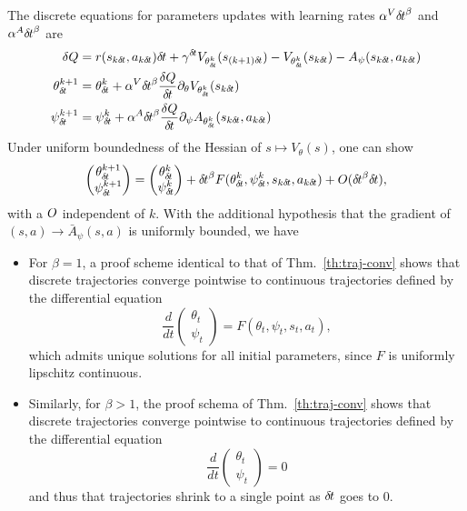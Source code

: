 The discrete equations for parameters updates with learning rates $\alpha^V {\delta\hspace{-.1em}t}^\beta$ and
$\alpha^A {\delta\hspace{-.1em}t}^\beta$ are
\begin{align}
	\delta Q &= r(s_{k \deltat}, a_{k \deltat}) \deltat + 
		\gamma^\deltat V_{\theta^{k}_\deltat}(s_{(k + 1)\deltat}) - 
		V_{\theta^k_\deltat}(s_{k\deltat}) - A_\psi(s_{k \deltat}, a_{k \deltat})\\
	\theta^{k+1}_\deltat &= \theta^k_\deltat + 
	\alpha^V \deltat^\beta \frac{\delta Q
	}{\deltat}\partial_\theta V_{\theta^k_\deltat}(s_{k\deltat})\\
	\psi^{k+1}_\deltat &= \psi^k_\deltat + 
	\alpha^A \deltat^\beta \frac{\delta Q
	}{\deltat}
	\partial_\psi A_{\theta^k_\deltat}(s_{k\deltat}, a_{k\deltat})
\end{align}
Under uniform boundedness of the Hessian of $s \mapsto V_\theta(s)$,
one can show
\begin{equation}
	\begin{pmatrix}
		\theta_{\delta\hspace{-.1em}t}^{k+1} \\
		\psi_{\delta\hspace{-.1em}t}^{k+1}
	\end{pmatrix} =
	\begin{pmatrix}
		\theta_{\delta\hspace{-.1em}t}^{k} \\
		\psi_{\delta\hspace{-.1em}t}^{k}
	\end{pmatrix} + {\delta\hspace{-.1em}t}^\beta F(\theta_{\delta\hspace{-.1em}t}^k, \psi_{\delta\hspace{-.1em}t}^k, s_{k {\delta\hspace{-.1em}t}}, a_{k{\delta\hspace{-.1em}t}}) + O({\delta\hspace{-.1em}t}^\beta {\delta\hspace{-.1em}t}),
\end{equation}
with a $O$ independent of $k$. With the additional hypothesis that the gradient of
$(s, a) \rightarrow \bar{A}_\psi(s, a)$ is uniformly bounded, we have
\begin{itemize}
	\item For $\beta = 1$, a proof scheme identical to that of Thm.~\ref{th:traj-conv} shows that
discrete trajectories converge pointwise to continuous trajectories defined by the differential equation
\begin{equation}
	\frac{d}{dt}\begin{pmatrix}
		\theta_t \\
		\psi_t
	\end{pmatrix} =
	F(\theta_t, \psi_t, s_t, a_t),
\end{equation}
which admits unique solutions for all initial parameters, since $F$ is uniformly lipschitz continuous.
\item Similarly, for $\beta > 1$, the proof schema of Thm.~\ref{th:traj-conv} shows that
discrete trajectories converge pointwise to continuous trajectories defined by the differential equation
\begin{equation}
	\frac{d}{dt}\begin{pmatrix}
		\theta_t \\
		\psi_t
	\end{pmatrix} = 0
\end{equation}
and thus that trajectories shrink to a single point as ${\delta\hspace{-.1em}t}$ goes to $0$.
\end{itemize}
